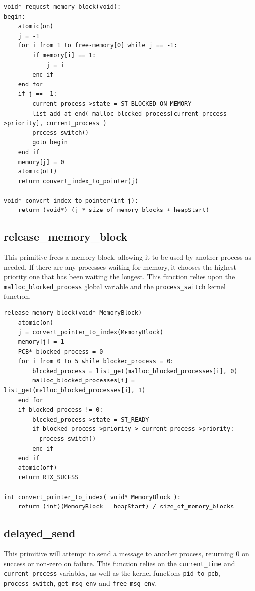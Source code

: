 \documentclass[titlepage]{article}
\begin{document}
\begin{verbatim}
void* request_memory_block(void):
begin:
    atomic(on)
    j = -1
    for i from 1 to free-memory[0] while j == -1:
        if memory[i] == 1:
            j = i
        end if
    end for
    if j == -1:
        current_process->state = ST_BLOCKED_ON_MEMORY
        list_add_at_end( malloc_blocked_process[current_process->priority], current_process )
        process_switch()
        goto begin
    end if
    memory[j] = 0
    atomic(off)
    return convert_index_to_pointer(j)

void* convert_index_to_pointer(int j):
    return (void*) (j * size_of_memory_blocks + heapStart)
\end{verbatim}


\subsection{release\_memory\_block}
This primitive frees a memory block, allowing it to be used by another process as needed.  If there are any processes waiting for
memory, it chooses the highest-priority one that has been waiting the longest.
This function relies upon the \verb!malloc_blocked_process! global variable and the
\verb!process_switch! kernel function.

\begin{verbatim}
release_memory_block(void* MemoryBlock)
    atomic(on)
    j = convert_pointer_to_index(MemoryBlock)
    memory[j] = 1
    PCB* blocked_process = 0
    for i from 0 to 5 while blocked_process = 0:
        blocked_process = list_get(malloc_blocked_processes[i], 0)
        malloc_blocked_processes[i] = list_get(malloc_blocked_processes[i], 1)
    end for
    if blocked_process != 0:
        blocked_process->state = ST_READY
        if blocked_process->priority > current_process->priority:
          process_switch()
        end if
    end if
    atomic(off)
    return RTX_SUCESS

int convert_pointer_to_index( void* MemoryBlock ):
    return (int)(MemoryBlock - heapStart) / size_of_memory_blocks
\end{verbatim}

\subsection{delayed\_send}
This primitive will attempt to send a message to another process, returning 0 on
success or non-zero on failure.  This function relies on the \verb!current_time! and
\verb!current_process! variables, as well as the kernel functions
\verb!pid_to_pcb!, \verb!process_switch!, \verb!get_msg_env! and \verb!free_msg_env!.
\end{document}
